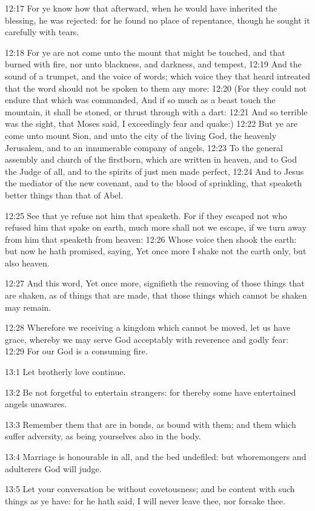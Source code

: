 12:17 For ye know how that afterward, when he would have inherited the blessing, he was rejected: for he found no place of repentance, though he sought it carefully with tears.

12:18 For ye are not come unto the mount that might be touched, and that burned with fire, nor unto blackness, and darkness, and tempest, 12:19 And the sound of a trumpet, and the voice of words; which voice they that heard intreated that the word should not be spoken to them any more: 12:20 (For they could not endure that which was commanded, And if so much as a beast touch the mountain, it shall be stoned, or thrust through with a dart: 12:21 And so terrible was the sight, that Moses said, I exceedingly fear and quake:) 12:22 But ye are come unto mount Sion, and unto the city of the living God, the heavenly Jerusalem, and to an innumerable company of angels, 12:23 To the general assembly and church of the firstborn, which are written in heaven, and to God the Judge of all, and to the spirits of just men made perfect, 12:24 And to Jesus the mediator of the new covenant, and to the blood of sprinkling, that speaketh better things than that of Abel.

12:25 See that ye refuse not him that speaketh. For if they escaped not who refused him that spake on earth, much more shall not we escape, if we turn away from him that speaketh from heaven: 12:26 Whose voice then shook the earth: but now he hath promised, saying, Yet once more I shake not the earth only, but also heaven.

12:27 And this word, Yet once more, signifieth the removing of those things that are shaken, as of things that are made, that those things which cannot be shaken may remain.

12:28 Wherefore we receiving a kingdom which cannot be moved, let us have grace, whereby we may serve God acceptably with reverence and godly fear: 12:29 For our God is a consuming fire.

13:1 Let brotherly love continue.

13:2 Be not forgetful to entertain strangers: for thereby some have entertained angels unawares.

13:3 Remember them that are in bonds, as bound with them; and them which suffer adversity, as being yourselves also in the body.

13:4 Marriage is honourable in all, and the bed undefiled: but whoremongers and adulterers God will judge.

13:5 Let your conversation be without covetousness; and be content with such things as ye have: for he hath said, I will never leave thee, nor forsake thee.

